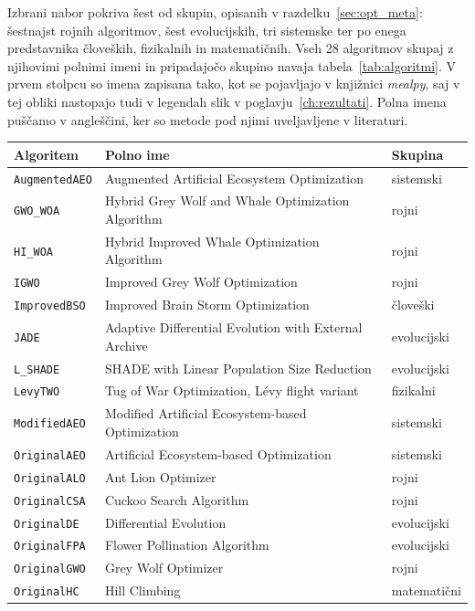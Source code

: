 \documentclass[a4paper, 12pt]{book}
\begin{document}
Izbrani nabor pokriva šest od skupin, opisanih v razdelku~\ref{sec:opt_meta}:
šestnajst rojnih algoritmov, šest evolucijskih, tri sistemske ter po enega
predstavnika človeških, fizikalnih in matematičnih. Vseh 28 algoritmov skupaj
z njihovimi polnimi imeni in pripadajočo skupino navaja
tabela~\ref{tab:algoritmi}. V prvem stolpcu so imena zapisana tako, kot se
pojavljajo v knjižnici \emph{mealpy}, saj v tej obliki nastopajo tudi v legendah
slik v poglavju~\ref{ch:rezultati}. Polna imena puščamo v angleščini, ker so
metode pod njimi uveljavljene v literaturi.

\begin{table}[p]
\centering
\small
\setlength{\tabcolsep}{5pt}
\begin{tabular}{@{}lll@{}}
\toprule
{\bf Algoritem} & {\bf Polno ime} & {\bf Skupina} \\
\midrule
\texttt{AugmentedAEO} & Augmented Artificial Ecosystem Optimization & sistemski \\
\texttt{GWO\_WOA} & Hybrid Grey Wolf and Whale Optimization Algorithm & rojni \\
\texttt{HI\_WOA} & Hybrid Improved Whale Optimization Algorithm & rojni \\
\texttt{IGWO} & Improved Grey Wolf Optimization & rojni \\
\texttt{ImprovedBSO} & Improved Brain Storm Optimization & človeški \\
\texttt{JADE} & Adaptive Differential Evolution with External Archive & evolucijski \\
\texttt{L\_SHADE} & SHADE with Linear Population Size Reduction & evolucijski \\
\texttt{LevyTWO} & Tug of War Optimization, Lévy flight variant & fizikalni \\
\texttt{ModifiedAEO} & Modified Artificial Ecosystem-based Optimization & sistemski \\
\texttt{OriginalAEO} & Artificial Ecosystem-based Optimization & sistemski \\
\texttt{OriginalALO} & Ant Lion Optimizer & rojni \\
\texttt{OriginalCSA} & Cuckoo Search Algorithm & rojni \\
\texttt{OriginalDE} & Differential Evolution & evolucijski \\
\texttt{OriginalFPA} & Flower Pollination Algorithm & evolucijski \\
\texttt{OriginalGWO} & Grey Wolf Optimizer & rojni \\
\texttt{OriginalHC} & Hill Climbing & matematični \\

\end{tabular}
\end{table}
\end{document}

